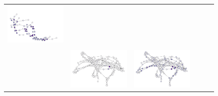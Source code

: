 \begin{figure}[tbhp]
\begin{center}
\begin{tabular}{cccccc}
			{\includegraphics[width=\imgwidth, align=c, trim={0 0 0 0}, clip]{proteins/46_437_72nodes_0_0_pooled.pdf}} \\ \\
			\rotatebox[origin=c]{90}{\small \dd$_{200}$} &
			{\includegraphics[width=\imgwidth, align=c, trim={0 0 0 0}, clip]{dd/65_640_212nodes_1_1_global.pdf}} &
			{\includegraphics[width=\imgwidth, align=c, trim={0 0 0 0}, clip]{dd/65_640_212nodes_1_1_unsup.pdf}} &

\end{tabular}
\end{center}
\end{figure}
